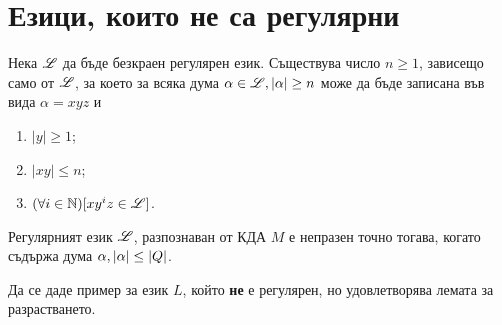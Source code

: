 \section{Езици, които не са регулярни}
\begin{lemma}
  Нека $\mathscr{L}$ да бъде безкраен регулярен език.
  Съществува число $n\geq 1$, зависещо само от $\mathscr{L}$, 
  за което за всяка дума $\alpha\in \mathscr{L}, \vert{\alpha}\vert\geq n$ може да 
  бъде записана във вида $\alpha = xyz$ и 
  \begin{enumerate}
  \item
    $|y|\geq 1$;
  \item
    $|xy|\leq n$;
  \item
    $(\forall i\in\mathbb{N})[xy^iz \in \mathscr{L}]$.
  \end{enumerate}
\end{lemma}

\begin{crl}
  Регулярният език $\mathscr{L}$, 
  разпознаван от КДА $M$ е непразен точно тогава, когато съдържа дума $\alpha, \vert{\alpha}\vert \leq \vert{Q}\vert$.
\end{crl}

\begin{problem}
  Да се даде пример за език $L$, който {\bf не} е регулярен, но удовлетворява
  лемата за разрастването.
\end{problem}


